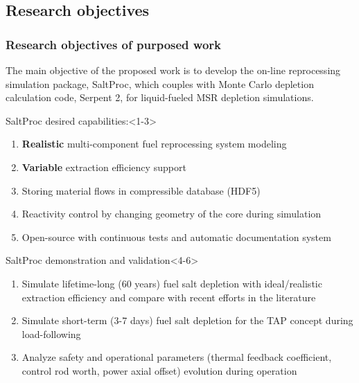 \subsection{Research objectives}

\begin{frame}
  \frametitle{Research objectives of purposed work}
                  \vspace*{-0.05in}
      The main objective of the proposed work is to develop the 
      on-line 
      reprocessing simulation package, SaltProc, which couples with Monte 
      Carlo depletion calculation code, Serpent 2, for liquid-fueled MSR 
      depletion simulations.
     \begin{block}{SaltProc desired capabilities:}<1-3>
         \begin{enumerate}
                \item \textbf{Realistic} multi-component fuel 
                reprocessing 
                system modeling
                \item \textbf{Variable} extraction efficiency support
                \item Storing material flows in compressible database 
                (HDF5)
                \item<2-3> Reactivity control by changing geometry of 
                the core during simulation
                \item<3> Open-source with continuous tests and 
                automatic documentation system 
         \end{enumerate}
      \end{block}
            \vspace{-0.1in}
	\begin{block}{SaltProc demonstration and validation}<4-6>
		\begin{enumerate}
			\item<4-6> Simulate lifetime-long (60 years) fuel salt 
			depletion with ideal/realistic extraction efficiency and 
			compare with recent efforts in the literature
			\item<5-6> Simulate short-term (3-7 days) fuel salt 
			depletion for the \gls{TAP} concept during load-following
			\item<6> Analyze safety and operational parameters 
			(thermal feedback coefficient, control rod worth, power 
			axial offset) evolution during operation 
		\end{enumerate}
	\end{block}
\end{frame}
